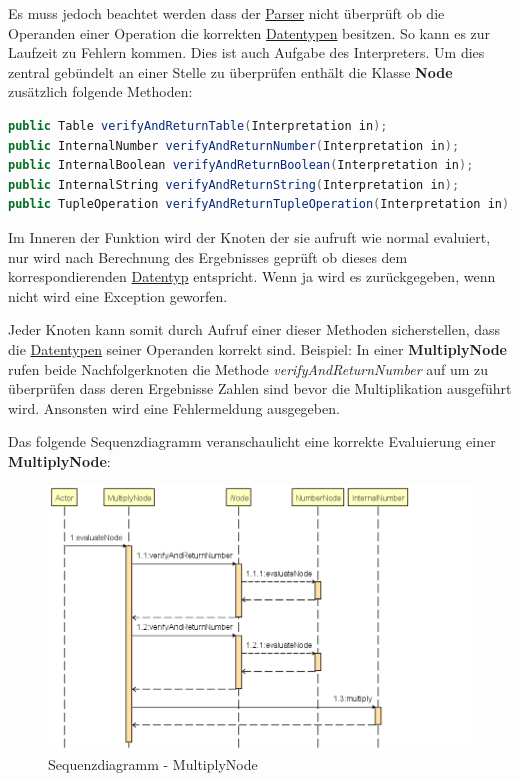 Es muss jedoch beachtet werden dass der \underline{Parser} nicht überprüft ob die Operanden einer Operation die korrekten \underline{Datentypen} besitzen. So kann es zur Laufzeit zu Fehlern kommen. Dies ist auch Aufgabe des Interpreters. Um dies zentral gebündelt an einer Stelle zu überprüfen enthält die Klasse \textbf{Node} zusätzlich folgende Methoden:

\begin{lstlisting}[caption=Methoden zur Typüberprüfung,label={lst:verifyMethods}, language=Java]
public Table verifyAndReturnTable(Interpretation in);
public InternalNumber verifyAndReturnNumber(Interpretation in);
public InternalBoolean verifyAndReturnBoolean(Interpretation in);
public InternalString verifyAndReturnString(Interpretation in);
public TupleOperation verifyAndReturnTupleOperation(Interpretation in);
\end{lstlisting}
Im Inneren der Funktion wird der Knoten der sie aufruft wie normal evaluiert, nur wird nach Berechnung des Ergebnisses geprüft ob dieses dem korrespondierenden \underline{Datentyp} entspricht. Wenn ja wird es zurückgegeben, wenn nicht wird eine Exception geworfen.

Jeder Knoten kann somit durch Aufruf einer dieser Methoden sicherstellen, dass die \underline{Datentypen} seiner Operanden korrekt sind. Beispiel: In einer \textbf{MultiplyNode} rufen beide Nachfolgerknoten die Methode \textit{verifyAndReturnNumber} auf um zu überprüfen dass deren Ergebnisse Zahlen sind bevor die Multiplikation ausgeführt wird. Ansonsten wird eine Fehlermeldung ausgegeben. 

Das folgende Sequenzdiagramm veranschaulicht eine korrekte Evaluierung einer \textbf{MultiplyNode}:
\begin{figure}[H]
\centering
	\includegraphics[width=1.1\textwidth]{images/MultiplySequenz.png}\par\vspace{0.5cm}
	\caption{Sequenzdiagramm - MultiplyNode}
\end{figure}


